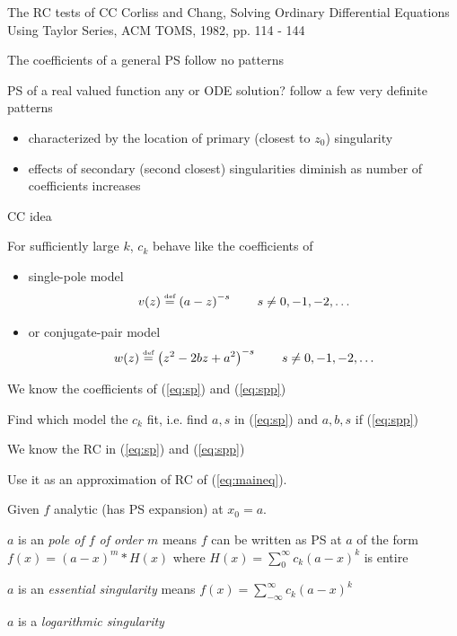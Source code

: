 \documentclass[11pt,svgnames,fleqn]{beamer}
\newcommand{\defeq}{\stackrel{\textup{\tiny def}}{=}}
\newcommand{\parbg}[1]{\left(  {#1} \right)}
\newcommand{\NC}[1]{{\color{red}#1}}
\begin{document}
\begin{frame}{The RC tests of CC}
{Corliss and Chang, Solving Ordinary Differential Equations 
  Using Taylor Series, ACM TOMS, 1982, pp. 114 - 144}

The coefficients of a general PS follow no patterns



  PS of a real valued function \NC{any or ODE solution?} follow a few very definite patterns
  \begin{itemize}
  \item  characterized by the
  location of primary (closest to $z_0$) singularity
  \item effects of secondary (second closest) singularities diminish as number of coefficients increases 
  \end{itemize}

\vspace{3mm}





  

\end{frame}

\begin{frame}{CC idea}

 For sufficiently large $k$, $c_k$  behave like the coefficients of
  \begin{itemize}
  \item single-pole model 
\begin{align}
 v(z) \defeq \parbg{a-z}^{-s}  \qquad s \neq 0, -1, -2, \ldots 
 \label{eq:sp}
 \end{align}
 \item or conjugate-pair model 
 \begin{align}
 w(z) \defeq \parbg{z^2 - 2 b z + a^2}^{-s} \qquad s \neq 0, -1, -2, \ldots
 \label{eq:spp}
 \end{align}
\end{itemize}

We know the coefficients of  (\ref{eq:sp}) and (\ref{eq:spp})

Find which model the $c_k$ fit, i.e. find
 $a, s$ in (\ref{eq:sp}) and $a,b,s$ if (\ref{eq:spp})

We know the RC in (\ref{eq:sp}) and (\ref{eq:spp})

Use it as an approximation of RC of (\ref{eq:maineq}).

  Given $f$ analytic (has PS expansion) at $x_0 = a$.

  $a$ is an {\it pole of $f$ of order $m$}
  means $f$ can be written as PS at $a$ of the form $f(x) = (a-x)^m * H(x)$ where $H(x) = \sum_0^{\infty} c_k (a-x)^k$
  is entire

  $a$ is an {\it essential singularity} means $f(x) = \sum_{-\infty}^{\infty} c_k (a - x)^k$

  $a$ is a {\it logarithmic singularity}
\end{frame}
\end{document}
